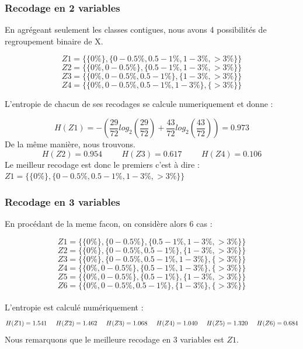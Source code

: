 \documentclass{article}
\begin{document}
\subsubsection{Recodage en 2 variables}

En agrégeant seulement les classes contigues, nous avons 4 possibilités de regroupement binaire de 
X.


\[
Z1 =\{ \{0 \% \} , \{0 - 0.5 \% ,0.5-1 \% ,1-3 \% ,>3 \% \} \}  
\]
\[
Z2 =\{ \{0 \% , 0 - 0.5 \%  \} , \{0.5-1 \% ,1-3 \% ,>3 \% \} \}
\]
\[
Z3 =\{ \{0 \%, 0 - 0.5 \% ,0.5-1 \%  \} , \{1-3 \% ,>3 \% \} \}
\]
\[
Z4 =\{ \{0 \% , 0 - 0.5 \% ,0.5-1 \% ,1-3 \% \} , \{>3 \% \} \}
\]


L'entropie de chacun de ses recodages se calcule numeriquement et donne :

\[
H(Z1) = -\left(\frac{29}{72}log_2(\frac{29}{72})+\frac{43}{72}log_2(\frac{43}{72})\right) = 0.973
\]
De la même manière, nous trouvons.
\[
H(Z2) = 0.954 \hspace{1cm} H(Z3) = 0.617 \hspace{1cm} H(Z4) = 0.106
\]
Le meilleur recodage est donc le premiers c'est à dire :
$Z1 =\{ \{0 \% \} , \{0 - 0.5 \% ,0.5-1 \% ,1-3 \% ,>3 \% \} \}$


\subsubsection{Recodage en 3 variables}

En procédant de la meme facon, on considère alors 6 cas :

\[
Z1 =\{ \{0 \% \} , \{0 - 0.5 \%\} ,\{0.5-1 \% ,1-3 \% ,>3 \% \} \}  
\]
\[
  Z2 =\{ \{0 \% \} , \{0 - 0.5\%, 0.5-1 \% \} ,\{1-3 \% ,>3 \% \} \}
\]
\[
  Z3 =\{ \{0 \% \} , \{0 - 0.5\%, 0.5-1 \% ,1-3 \%  \} ,\{>3 \% \} \}
\]
\[
  Z4 =\{ \{0 \%, 0 - 0.5\%\} , \{ 0.5-1 \% ,1-3 \%  \} ,\{>3 \% \} \}
\]
\[
  Z5 =\{ \{0 \%, 0 - 0.5\%\} , \{ 0.5-1 \% \} ,\{1-3 \% , >3 \% \} \}
\]
\[
  Z6 =\{ \{0 \%, 0 - 0.5\%,  0.5-1 \% \} , \{1-3 \%  \} ,\{>3 \% \} \}
\]
\\
L'entropie est calculé numériquement :
\[
H(Z1) = 1.541 \hspace{0.5cm} H(Z2) = 1.462 \hspace{0.5cm} H(Z3) = 1.068 \hspace{0.5cm} H(Z4) = 1.040 \hspace{0,5cm} H(Z5) = 1.320 \hspace{0,5 cm} H(Z6) = 0.684
\]
Nous remarquons que le meilleure recodage en 3 variables est $Z1$.
\end{document}
